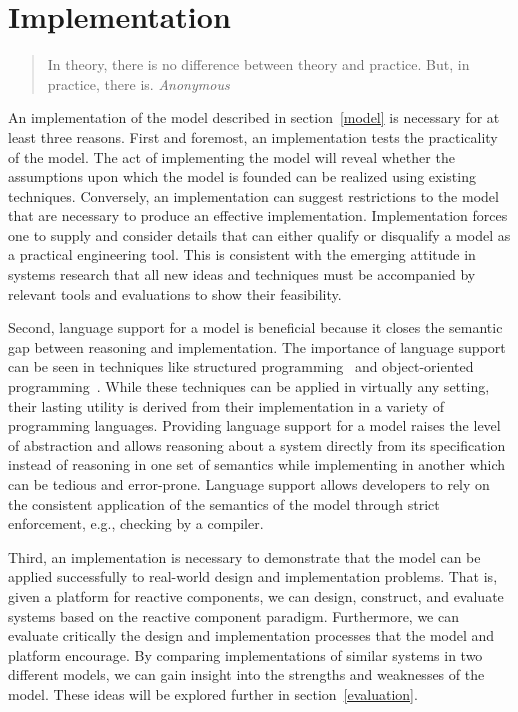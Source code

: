 \section{Implementation \label{implementation}}

\begin{quote}
In theory, there is no difference between theory and practice. \linebreak
But, in practice, there is.  \emph{Anonymous}
\end{quote}

An implementation of the model described in section~\ref{model} is necessary for at least three reasons.
First and foremost, an implementation tests the practicality of the model.
The act of implementing the model will reveal whether the assumptions upon which the model is founded can be realized using existing techniques.
Conversely, an implementation can suggest restrictions to the model that are necessary to produce an effective implementation.
Implementation forces one to supply and consider details that can either qualify or disqualify a model as a practical engineering tool.
This is consistent with the emerging attitude in systems research that all new ideas and techniques must be accompanied by relevant tools and evaluations to show their feasibility.

Second, language support for a model is beneficial because it closes the semantic gap between reasoning and implementation.
The importance of language support can be seen in techniques like structured programming~\cite{dahl1972structured} and object-oriented programming~\cite{booch1982object}.
While these techniques can be applied in virtually any setting, their lasting utility is derived from their implementation in a variety of programming languages.
Providing language support for a model raises the level of abstraction and allows reasoning about a system directly from its specification instead of reasoning in one set of semantics while implementing in another which can be tedious and error-prone.
Language support allows developers to rely on the consistent application of the semantics of the model through strict enforcement, e.g., checking by a compiler.

Third, an implementation is necessary to demonstrate that the model can be applied successfully to real-world design and implementation problems.
That is, given a platform for reactive components, we can design, construct, and evaluate systems based on the reactive component paradigm.
Furthermore, we can evaluate critically the design and implementation processes that the model and platform encourage.
By comparing implementations of similar systems in two different models, we can gain insight into the strengths and weaknesses of the model.
These ideas will be explored further in section~\ref{evaluation}.

